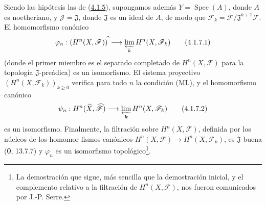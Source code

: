 \begin{corollary}[4.1.7]
\label{III.4.1.7-fr}
Siendo las hipótesis las de \textup{(\hyperref[III.4.1.5-fr]{4.1.5})}, supongamos
además $Y=\operatorname{Spec}(A)$, donde $A$ es noetheriano, y
$\mathcal J=\widetilde{\mathfrak J}$, donde $\mathfrak J$ es un ideal de
$A$, de modo que
$\mathcal F_k=\mathcal F/\mathfrak J^{k+1}\mathcal F$.
El homomorfismo canónico
\[
\varphi_n:(H^n(X,\mathcal F))^{\widehat{\,}}
\longrightarrow\varprojlim_kH^n(X,\mathcal F_k)
\tag{4.1.7.1}\label{III.4.1.7.1-fr}
\]
(donde el primer miembro es el separado completado de $H^n(X,\mathcal F)$ para
la topología $\mathfrak J$-preádica) es un isomorfismo. El sistema
proyectivo $(H^n(X,\mathcal F_k))_{k\geq0}$ verifica para todo $n$ la
condición \textup{(ML)}, y el homomorfismo canónico
\[
\psi_n:H^n(\widehat X,\widehat{\mathcal F})
\longrightarrow\varprojlim_{\boldsymbol{k}}H^n(X,\mathcal F_k)
\tag{4.1.7.2}\label{III.4.1.7.2-fr}
\]
es un isomorfismo. Finalmente, la filtración sobre $H^n(X,\mathcal F)$, definida
por los núcleos de los homomor%
fismos canónicos
$H^n(X,\mathcal F)\to H^n(X,\mathcal F_k)$, es $\mathfrak J$-buena
\textup{(\textbf{0}, 13.7.7)} y $\varphi_n$ es un isomorfismo topológico\footnote{La demostración que sigue, más sencilla que la demostración
inicial, y el complemento relativo a la filtración de
$H^n(X,\mathcal F)$, nos fueron comunicados por J.-P. Serre.}.
\end{corollary}

